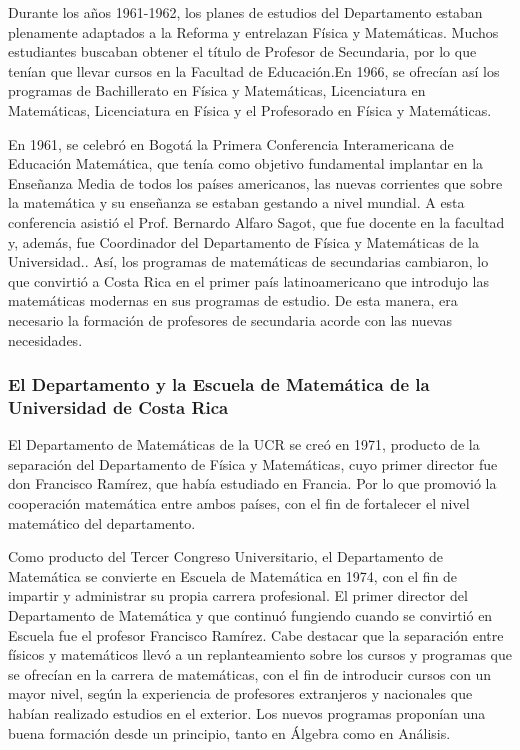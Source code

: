 Durante los años 1961-1962, los planes de estudios del Departamento estaban plenamente adaptados a la Reforma y entrelazan Física y Matemáticas. Muchos estudiantes buscaban obtener el título de Profesor de Secundaria, por lo que tenían que llevar cursos en la Facultad de Educación.En 1966, se ofrecían así los programas de Bachillerato en Física y Matemáticas, Licenciatura en Matemáticas, Licenciatura en Física y el Profesorado en Física y Matemáticas. 

En 1961, se celebró en Bogotá la Primera Conferencia Interamericana de Educación Matemática, que tenía como objetivo fundamental implantar en la Enseñanza Media de todos los países americanos, las nuevas corrientes que sobre la matemática y su enseñanza se estaban gestando a nivel mundial. A esta conferencia asistió el Prof. Bernardo Alfaro Sagot, que fue docente en la facultad y, además, fue Coordinador del Departamento de Física y Matemáticas de la Universidad.. Así, los programas de matemáticas de secundarias cambiaron, lo que convirtió a Costa Rica en el primer país latinoamericano que introdujo las matemáticas modernas en sus programas de estudio. De esta manera, era necesario la formación de profesores de secundaria acorde con las nuevas necesidades.

 \subsubsection*{El Departamento y la Escuela de Matemática de la Universidad de Costa Rica }
 
El Departamento de Matemáticas de la UCR se creó en 1971, producto de la separación del Departamento de Física y Matemáticas, cuyo primer director fue don Francisco Ramírez, que había estudiado en Francia. Por lo que promovió la cooperación matemática entre ambos países, con el fin de fortalecer el nivel matemático del departamento. 

Como producto del Tercer Congreso Universitario, el Departamento de Matemática se convierte en Escuela de Matemática en 1974, con el fin de impartir y administrar su propia carrera profesional. El primer director del Departamento de Matemática y que continuó fungiendo cuando se convirtió en Escuela fue el profesor Francisco Ramírez. Cabe destacar que la separación entre físicos y matemáticos llevó a un replanteamiento sobre los cursos y programas que se ofrecían en la carrera de matemáticas, con el fin de introducir cursos con un mayor nivel, según la experiencia de profesores extranjeros y nacionales que habían realizado estudios en el exterior. Los nuevos programas proponían una buena formación desde un principio, tanto en Álgebra como en Análisis. 

